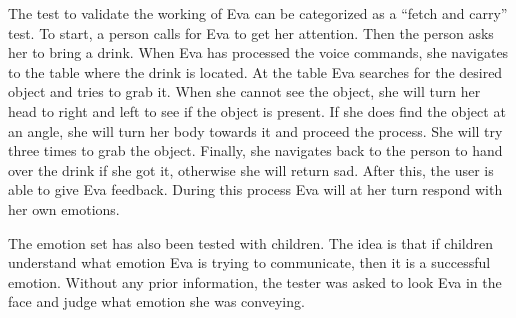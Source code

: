 \documentclass[project_eva.tex]{subfiles}
\begin{document}
The test to validate the working of Eva can be categorized as a ``fetch and carry'' test. To start, a person calls for Eva to get her attention. Then the person asks her to bring a drink. When Eva has processed the voice commands, she navigates to the table where the drink is located. At the table Eva searches for the desired object and tries to grab it. When she cannot see the object, she will turn her head to right and left to see if the object is present. If she does find the object at an angle, she will turn her body towards it and proceed the process. She will try three times to grab the object. Finally, she navigates back to the person to hand over the drink if she got it, otherwise she will return sad. After this, the user is able to give Eva feedback. During this process Eva will at her turn respond with her own emotions.

The emotion set has also been tested with children. The idea is that if children understand what emotion Eva is trying to communicate, then it is a successful emotion. Without any prior information, the tester was asked to look Eva in the face and judge what emotion she was conveying.
\end{document}
